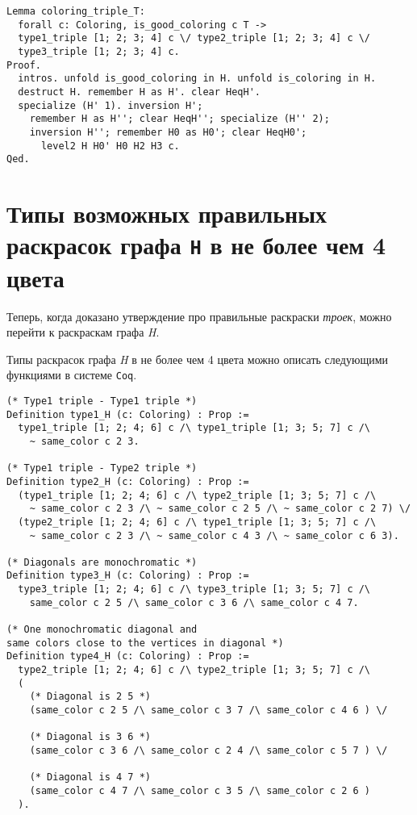 \begin{verbatim}
Lemma coloring_triple_T:
  forall c: Coloring, is_good_coloring c T ->
  type1_triple [1; 2; 3; 4] c \/ type2_triple [1; 2; 3; 4] c \/
  type3_triple [1; 2; 3; 4] c.
Proof.
  intros. unfold is_good_coloring in H. unfold is_coloring in H. 
  destruct H. remember H as H'. clear HeqH'. 
  specialize (H' 1). inversion H';
    remember H as H''; clear HeqH''; specialize (H'' 2); 
    inversion H''; remember H0 as H0'; clear HeqH0';
      level2 H H0' H0 H2 H3 c.
Qed.
\end{verbatim}

\section{Типы возможных правильных раскрасок графа {\tt H} в не более чем 4 цвета}

Теперь, когда доказано утверждение про правильные раскраски {\it троек}, можно перейти к раскраскам графа {\it H}.

Типы раскрасок графа {\it H} в не более чем 4 цвета можно описать следующими функциями в системе {\tt Coq}.

\begin{verbatim}
(* Type1 triple - Type1 triple *)
Definition type1_H (c: Coloring) : Prop :=
  type1_triple [1; 2; 4; 6] c /\ type1_triple [1; 3; 5; 7] c /\
    ~ same_color c 2 3.

(* Type1 triple - Type2 triple *)
Definition type2_H (c: Coloring) : Prop :=
  (type1_triple [1; 2; 4; 6] c /\ type2_triple [1; 3; 5; 7] c /\
    ~ same_color c 2 3 /\ ~ same_color c 2 5 /\ ~ same_color c 2 7) \/
  (type2_triple [1; 2; 4; 6] c /\ type1_triple [1; 3; 5; 7] c /\
    ~ same_color c 2 3 /\ ~ same_color c 4 3 /\ ~ same_color c 6 3).

(* Diagonals are monochromatic *)
Definition type3_H (c: Coloring) : Prop :=
  type3_triple [1; 2; 4; 6] c /\ type3_triple [1; 3; 5; 7] c /\
    same_color c 2 5 /\ same_color c 3 6 /\ same_color c 4 7.

(* One monochromatic diagonal and 
same colors close to the vertices in diagonal *)
Definition type4_H (c: Coloring) : Prop :=
  type2_triple [1; 2; 4; 6] c /\ type2_triple [1; 3; 5; 7] c /\
  (
    (* Diagonal is 2 5 *) 
    (same_color c 2 5 /\ same_color c 3 7 /\ same_color c 4 6 ) \/

    (* Diagonal is 3 6 *) 
    (same_color c 3 6 /\ same_color c 2 4 /\ same_color c 5 7 ) \/

    (* Diagonal is 4 7 *) 
    (same_color c 4 7 /\ same_color c 3 5 /\ same_color c 2 6 )
  ).
\end{verbatim}

